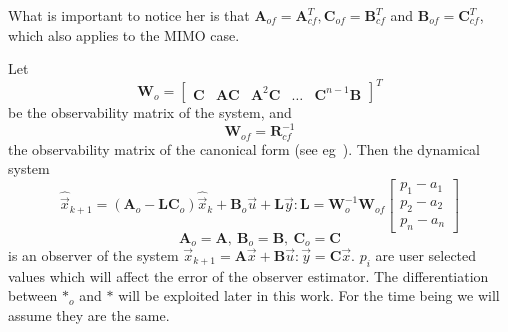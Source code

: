 \documentclass[runningheads,a4paper]{llncs}
\newcommand{\mat}[1]{\boldsymbol{#1}}
\begin{document}
What is important to notice her is that $\mat{A}_{of}=\mat{A}_{cf}^T, \mat{C}_{of}=\mat{B}_{cf}^T$
and $\mat{B}_{of}=\mat{C}_{cf}^T$, which also applies to the MIMO case.

Let 
\begin{equation}
\label{eq:wnof}
\mat{W}_o=[\begin{array}{ccccc}\mat{C}&\mat{A}\mat{C}&\mat{A}^2\mat{C}&\hdots&\mat{C}^{n-1}\mat{B}\end{array}]^T
\end{equation}
be the observability matrix of the system, and
\begin{equation}
\label{eq:wof}
\mat{W}_{of}=\mat{R}_{cf}^{-1}
\end{equation}
the observability matrix of the canonical form (see eg~\cite{astrom1997computer}). 
Then the dynamical system 
\begin{equation}
\label{eq:to_of}
\hat{\vec{x}}_{k+1}=(\mat{A}_o-\mat{L}\mat{C}_o)\hat{\vec{x}}_k+\mat{B}_o\vec{u}+\mat{L}\vec{y} : \mat{L}=\mat{W}_o^{-1}\mat{W}_{of} \left[ \begin{array}{c}p_1-a_1\\p_2-a_2\\p_n-a_n\end{array}\right]
\end{equation}
\begin{displaymath}
\mat{A}_o=\mat{A},\ \mat{B}_o=\mat{B},\ \mat{C}_o=\mat{C}
\end{displaymath}
is an observer of the system $\vec{x}_{k+1}=\mat{A}\vec{x}+\mat{B}\vec{u} : \vec{y}=\mat{C}\vec{x}$. $p_i$ are user selected
values which will affect the error of the observer estimator. The differentiation between $\mat{*}_o$ and $\mat{*}$ will be exploited later in this work. For the time being we will assume they are the same.
\end{document}
